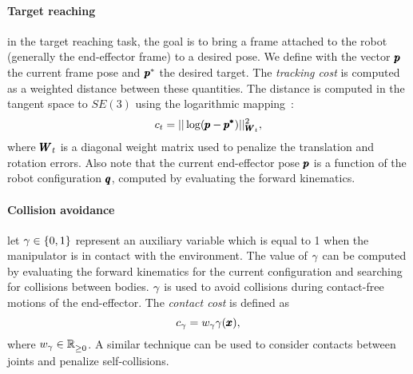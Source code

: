 \paragraph{Target reaching} in the target reaching task, the goal is to bring a frame attached to the robot (generally the end-effector frame) to a desired pose. We define with the vector $\pmb{p}$ the current frame pose and $\pmb{p}^*$ the desired target. The \textit{tracking cost} is computed as a weighted distance between these quantities. The distance is computed in the tangent space to $SE(3)$ using the logarithmic mapping~\cite{blanco2010tutorial}:
\begin{equation} \label{eq:tracking_cost}
     c_{t} = || \log(\pmb{p} - \pmb{p^{*}}) ||^2_{\pmb{W}_{t}},
 \end{equation}
 where $\pmb{W}_{t}$ is a diagonal weight matrix used to penalize the translation and rotation errors. Also note that the current end-effector pose $\pmb{p}$ is a function of the robot configuration $\pmb{q}$, computed by evaluating the forward kinematics.
 
 \paragraph{Collision avoidance} let $\gamma \in \{0, 1\}$ represent an auxiliary variable which is equal to 1 when the manipulator is in contact with the environment. The value of $\gamma$ can be computed by evaluating the forward kinematics for the current configuration and searching for collisions between bodies. 
 $\gamma$ is used to avoid collisions during contact-free motions of the end-effector. 
 The \textit{contact cost} is defined as
 \begin{equation}
     c_{\gamma}= w_{\gamma} \gamma(\pmb{x}), 
 \end{equation}
where $w_{\gamma} \in \mathbb{R}^{}_{\geq 0}$. 
 A similar technique can be used to consider contacts between joints and penalize self-collisions. 

